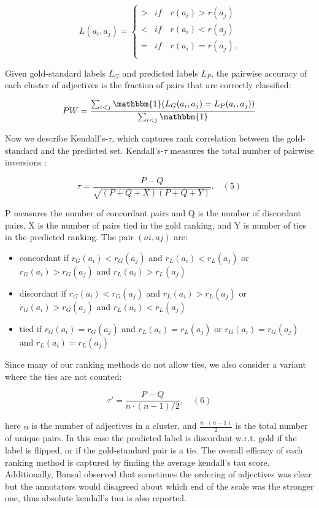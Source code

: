 \[
  L(a_i, a_j) = \begin{cases}
  > & if \quad r(a_i) > r(a_j)\\
  < & if \quad r(a_i) < r(a_j)\\
  = & if \quad r(a_i) = r(a_j).\\
  \end{cases}
\]

Given gold-standard labels $L_G$ and predicted labels $L_P$, the pairwise accuracy of each cluster of adjectives is the fraction of pairs that are correctly classified:

\[
PW = \frac{ \sum_{i < j} \mathbbm{1}( L_G(a_i,a_j) = L_P(a_i,a_j) )  }{\sum_{i<j} \mathbbm{1} }
\]

Now we describe Kendall's-$\tau$, which captures rank correlation between the gold-standard and the predicted set. Kendall's-$\tau$ measures the total number of pairwise inversions :

\[
\tau = \frac{ P - Q }{\sqrt{  (P + Q + X)(P + Q + Y) }  }. \quad (5)
\]


P measures the number of concordant pairs and Q is the number of discordant pairs, X is the number of pairs tied in the gold ranking, and Y is number of ties in the predicted ranking. The pair $(ai,aj)$ are:

\begin{itemize}
\item concordant if $r_G(a_i) < r_G(a_j)$ and $r_L(a_i) < r_L(a_j)$ or $r_G(a_i)> r_G(a_j)$ and $r_L(a_i) > r_L(a_j)$
\item discordant if $r_G(a_i) < r_G(a_j)$ and $r_L(a_i) > r_L(a_j)$ or $r_G(a_i) > r_G(a_j)$ and $r_L(a_i) < r_L(a_j)$
\item tied if $r_G(a_i) = r_G(a_j)$ and $r_L(a_i) = r_L(a_j)$ or $r_G(a_i) = r_G(a_j)$ and $r_L(a_i) = r_L(a_j)$
\end{itemize}

Since many of our ranking methods do not allow ties, we also consider a variant where the ties are not counted:

\[
  \tau' = \frac{ P - Q }{n \cdot (n-1)/ 2 }, \quad (6)
\]

here $n$ is the number of adjectives in a cluster, and $\frac{n \cdot (n-1)}{2}$ is the total number of unique pairs. In this case the predicted label is discordant w.r.t. gold if the label is flipped, or if the gold-standard pair is a tie. The overall efficacy of each ranking method is captured by finding the average kendall's tau score. Additionally, Bansal observed that sometimes the ordering of adjectives was clear but the annotators would disagreed about which end of the scale was the stronger one, thus absolute kendall's tau is also reported.

